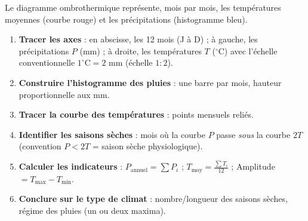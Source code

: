 \documentclass[11pt]{article}
\newcommand{\cle}[1]{{\popxbold\color{popdark}#1}}
\begin{document}
\begin{methode}
Le diagramme ombrothermique représente, mois par mois, les \cle{températures moyennes} (courbe rouge) et les \cle{précipitations} (histogramme bleu).
\begin{enumerate}
\item \textbf{Tracer les axes} : en abscisse, les 12 mois (J à D) ; à gauche, les précipitations $P$ (mm) ; à droite, les températures $T$ ($^{\circ}\mathrm{C}$) avec l'échelle conventionnelle $1^{\circ}\mathrm{C} = 2$ mm (échelle $1:2$).
\item \textbf{Construire l'histogramme des pluies} : une barre par mois, hauteur proportionnelle aux mm.
\item \textbf{Tracer la courbe des températures} : points mensuels reliés.
\item \textbf{Identifier les saisons sèches} : mois où la courbe $P$ passe \emph{sous} la courbe $2T$ (convention $P < 2T$ = saison sèche physiologique).
\item \textbf{Calculer les indicateurs} : $P_{\text{annuel}} = \sum P_i$ ; $T_{\text{moy}} = \frac{\sum T_i}{12}$ ; Amplitude $= T_{\max} - T_{\min}$.
\item \textbf{Conclure sur le type de climat} : nombre/longueur des saisons sèches, régime des pluies (un ou deux maxima).
\end{enumerate}
\end{methode}
\end{document}
